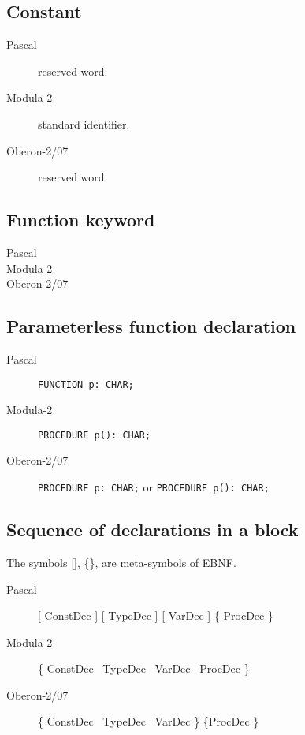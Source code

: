 \documentclass[10pt]{article}
\begin{document}
\subsection{Constant \NIL}
\begin{description}
    \item[Pascal] reserved word.
    \item[Modula-2] standard identifier.
    \item[Oberon-2/07] reserved word.
\end{description}

\subsection{Function keyword }
\begin{description}
    \item[Pascal] \FUNCTION 
    \item[Modula-2] \PROCEDURE
    \item[Oberon-2/07] \PROCEDURE
\end{description}

\subsection{Parameterless function declaration }
\begin{description}
    \item[Pascal] \lstinline!FUNCTION p: CHAR;!
    \item[Modula-2] \lstinline!PROCEDURE p(): CHAR;!
    \item[Oberon-2/07] \lstinline!PROCEDURE p: CHAR;! or \lstinline!PROCEDURE p(): CHAR;!
\end{description}

\subsection{Sequence of declarations in a block}
The symbols [], \{\}, \textbar are meta-symbols of EBNF. 

\begin{description}
    \item[Pascal] [ ConstDec ] [ TypeDec ] [ VarDec ] \{ ProcDec \}
    \item[Modula-2] \{ ConstDec \textbar\ TypeDec \textbar\ VarDec \textbar\  ProcDec \}
    \item[Oberon-2/07]  \{ ConstDec \textbar\ TypeDec \textbar\ VarDec \} \{ProcDec \}
\end{description}
\end{document}
